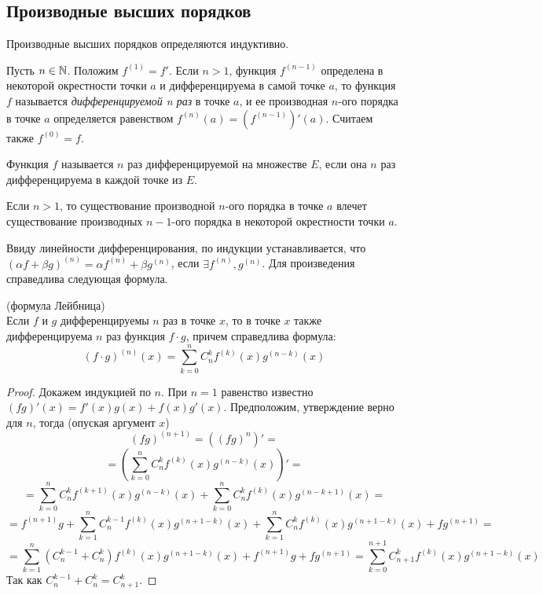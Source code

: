 \subsection{Производные высших порядков}
Производные высших порядков определяются индуктивно.

\begin{definition}
    Пусть $n \in \mathbb{N}$. Положим $f^{(1)} = f'$.
    Если $n > 1$, функция $f^{(n-1)}$ определена в некоторой окрестности точки $a$
    и дифференцируема в самой точке $a$, то функция $f$ называется
    \textit{дифференцируемой n раз} в точке $a$, и ее производная $n$-ого порядка
    в точке $a$ определяется равенством $f^{(n)}(a) = (f^{(n-1)})'(a)$.
    Считаем также $f^{(0)} = f$.    
\end{definition}

Функция $f$ называется $n$ раз дифференцируемой на множестве $E$,
если она $n$ раз дифференцируема в каждой точке из $E$. 

\begin{note}
    Если $n > 1$, то существование производной $n$-ого порядка в точке $a$
    влечет существование производных $n-1$-ого порядка в некоторой окрестности точки $a$.
\end{note}

Ввиду линейности дифференцирования, по индукции устанавливается, что $(\alpha f + \beta g)^{(n)} = \alpha f^{(n)} + \beta g^{(n)}$, если $\exists f^{(n)}, g^{(n)}$.
Для произведения справедлива следующая формула.

\begin{theorem} (формула Лейбница)\\
    Если $f$ и $g$ дифференцируемы $n$ раз в точке $x$,
    то в точке $x$ также дифференцируема $n$ раз функция $f \cdot g$,
    причем справедлива формула: \[(f\cdot g)^{(n)} (x) = \sum_{k = 0}^{n} C_{n}^{k}f^{(k)}(x)g^{(n-k)}(x)\]
\end{theorem}

\begin{proof}
    Докажем индукцией по $n$. При $n = 1$ равенство известно $(fg)'(x) = f'(x)g(x) + f(x)g'(x)$.
    Предположим, утверждение верно для $n$, тогда (опуская аргумент $x$)
    \[(fg)^{(n+1)} = ((fg)^{n})' = \]
    \[= (\sum_{k = 0}^{n} C_{n}^{k}f^{(k)}(x)g^{(n-k)}(x))' = \]
    \[= \sum_{k = 0}^{n} C_{n}^{k}f^{(k+1)}(x)g^{(n-k)}(x) + \sum_{k = 0}^{n} C_{n}^{k}f^{(k)}(x)g^{(n-k+1)}(x) = \]
    \[= f^{(n+1)}g + \sum_{k = 1}^{n} C_{n}^{k-1}f^{(k)}(x)g^{(n+1-k)}(x) + \sum_{k = 1}^{n} C_{n}^{k}f^{(k)}(x)g^{(n+1-k)}(x) + fg^{(n+1)} = \]
    \[= \sum_{k = 1}^{n} (C_{n}^{k-1} + C_{n}^{k})f^{(k)}(x)g^{(n+1-k)}(x) + f^{(n+1)}g + fg^{(n+1)} =
    \sum_{k = 0}^{n+1} C_{n+1}^{k}f^{(k)}(x)g^{(n+1-k)}(x) \]
    Так как $C_{n}^{k-1} + C_{n}^{k} = C_{n+1}^{k}$.
\end{proof}

